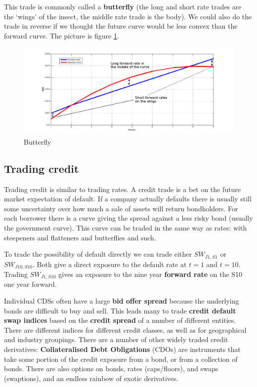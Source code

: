This trade is commonly called a \textbf{butterfly} (the long and short rate trades are the `wings' of the insect, the middle rate trade is the body). We could also do the trade in reverse if we thought the future curve would be less convex than the forward curve. The picture is figure \ref{fig:butterfly}.

\begin{figure}[ht]
\centering
  \includegraphics[width=5in] {pics/butterfly}
\caption{Butterfly}
\label{fig:butterfly}
\end{figure}

\subsection{Trading credit}

Trading credit is similar to trading rates. A credit trade is a bet on the future market expectation of default. If a company actually defaults there is usually still some uncertainty over how much a sale of assets will return bondholders.  For each borrower there is a curve giving the spread against a less risky bond (usually the government curve). This curve can be traded in the same way as rates: with steepeners and flatteners and butterflies and such.

To trade the possibility of default directly we can trade either $SW_{J1,S1}$ or $SW_{J10,S10}$. Both give a direct exposure to the default rate at $t=1$ and $t=10$. Trading $SW_{J1,S10}$ gives an exposure to the nine year \textbf{forward rate} on the S10 one year forward.

Individual CDSs often have a large \textbf{bid offer spread} because the underlying bonds are difficult to buy and sell. This leads many to trade \textbf{credit default swap indices} based on the \textbf{credit spread} of a number of different entities. There are different indices for different credit classes, as well as for geographical and industry groupings. There are a number of other widely traded credit derivatives: \textbf{Collateralised Debt Obligations} (CDOs) are instruments that take some portion of the credit exposure from a bond, or from a collection of bonds. There are also options on bonds, rates (caps/floors), and swaps (swaptions), and an endless rainbow of exotic derivatives. 

